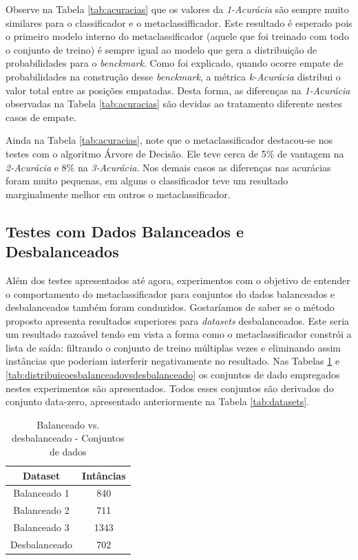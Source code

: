 Observe na Tabela \ref{tab:acuracias} que os valores da \textit{1-Acurácia} são sempre muito similares para o classificador e o metaclassifficador.
Este resultado é esperado pois o primeiro modelo interno do metaclassificador (aquele que foi treinado com todo o conjunto de treino) é sempre igual ao modelo que gera a distribuição de probabilidades para o \textit{benckmark}.
Como foi explicado, quando ocorre empate de probabilidades na construção desse \textit{benckmark}, a métrica \textit{k-Acurácia} distribui o valor total entre as posições empatadas.
Desta forma, as diferenças na \textit{1-Acurácia} observadas na Tabela \ref{tab:acuracias} são devidas ao tratamento diferente nestes casos de empate.

Ainda na Tabela \ref{tab:acuracias}, note que o metaclassificador destacou-se nos testes com o algoritmo Árvore de Decisão.
Ele teve cerca de 5\% de vantagem na \textit{2-Acurácia} e 8\% na \textit{3-Acurácia}.
Nos demais casos as diferenças nas acurácias foram muito pequenas, em alguns o classificador teve um resultado marginalmente melhor em outros o metaclassificador.

\subsection{Testes com Dados Balanceados e Desbalanceados}

Além dos testes apresentados até agora, experimentos com o objetivo de entender o comportamento do metaclassificador para conjuntos do dados balanceados e desbalanceados também foram conduzidos.
Gostaríamos de saber se o método proposto apresenta resultados superiores para \textit{datasets} desbalanceados.
Este seria um resultado razoável tendo em vista a forma como o metaclassificador constrói a lista de saída: filtrando o conjunto de treino múltiplas vezes e eliminando assim instâncias que poderiam interferir negativamente no resultado.
Nas Tabelas \ref{tab:balanceadovsdesbalanceado} e \ref{tab:distribuicoesbalanceadovsdesbalanceado} os conjuntos de dado empregados nestes experimentos são apresentados.
Todos esses conjuntos são derivados do conjunto data-zero, apresentado anteriormente na Tabela \ref{tab:datasets}.

\begin{table}[h!]
  \begin{center}
    \begin{tabular}{cc}
      \hline
      \textbf{Dataset} & \textbf{Intâncias} \\
      \hline

      Balanceado 1 & 840\\
      Balanceado 2 & 711\\
      Balanceado 3 & 1343\\
      Desbalanceado & 702\\

      \hline
    \end{tabular}
    \caption{Balanceado vs. desbalanceado - Conjuntos de dados}
    \label{tab:balanceadovsdesbalanceado}
  \end{center}
\end{table}


